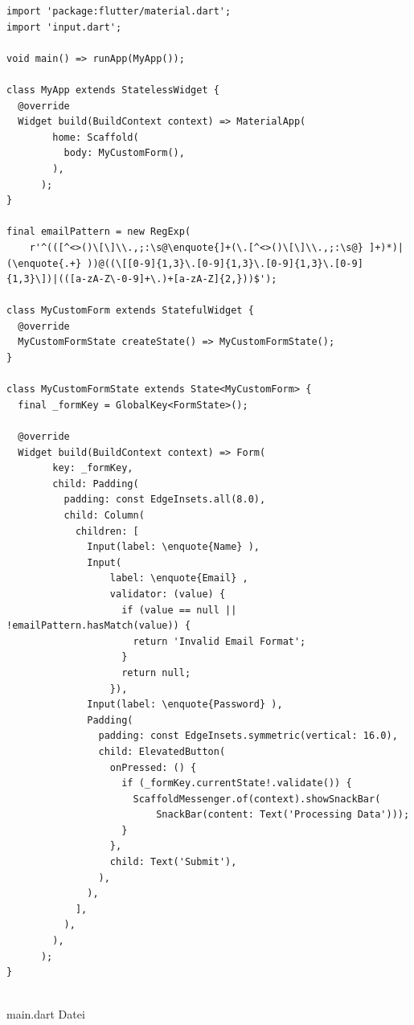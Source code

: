 \begin{listing}[H]
	\label{lst:quelltext1}

    \begin{verbatim}
import 'package:flutter/material.dart';
import 'input.dart';

void main() => runApp(MyApp());

class MyApp extends StatelessWidget {
  @override
  Widget build(BuildContext context) => MaterialApp(
		home: Scaffold(
		  body: MyCustomForm(),
		),
	  );
}

final emailPattern = new RegExp(
    r'^(([^<>()\[\]\\.,;:\s@\enquote{]+(\.[^<>()\[\]\\.,;:\s@} ]+)*)|(\enquote{.+} ))@((\[[0-9]{1,3}\.[0-9]{1,3}\.[0-9]{1,3}\.[0-9]{1,3}\])|(([a-zA-Z\-0-9]+\.)+[a-zA-Z]{2,}))$');

class MyCustomForm extends StatefulWidget {
  @override
  MyCustomFormState createState() => MyCustomFormState();
}

class MyCustomFormState extends State<MyCustomForm> {
  final _formKey = GlobalKey<FormState>();

  @override
  Widget build(BuildContext context) => Form(
		key: _formKey,
		child: Padding(
		  padding: const EdgeInsets.all(8.0),
		  child: Column(
			children: [
			  Input(label: \enquote{Name} ),
			  Input(
				  label: \enquote{Email} ,
				  validator: (value) {
					if (value == null || !emailPattern.hasMatch(value)) {
					  return 'Invalid Email Format';
					}
					return null;
				  }),
			  Input(label: \enquote{Password} ),
			  Padding(
				padding: const EdgeInsets.symmetric(vertical: 16.0),
				child: ElevatedButton(
				  onPressed: () {
					if (_formKey.currentState!.validate()) {
					  ScaffoldMessenger.of(context).showSnackBar(
						  SnackBar(content: Text('Processing Data')));
					}
				  },
				  child: Text('Submit'),
				),
			  ),
			],
		  ),
		),
	  );
}
		
    \end{verbatim}

    \caption[main.dart]{main.dart Datei}
\end{listing}


